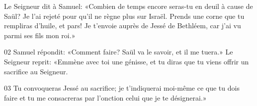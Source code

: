 Le Seigneur dit à Samuel: «Combien de temps encore seras-tu en deuil à cause de Saül? Je l’ai rejeté pour qu’il ne règne plus sur Israël. Prends une corne que tu rempliras d’huile, et pars! Je t’envoie auprès de Jessé de Bethléem, car j’ai vu parmi ses fils mon roi.»

02 Samuel répondit: «Comment faire? Saül va le savoir, et il me tuera.» Le Seigneur reprit: «Emmène avec toi une génisse, et tu diras que tu viens offrir un sacrifice au Seigneur.

03 Tu convoqueras Jessé au sacrifice; je t’indiquerai moi-même ce que tu dois faire et tu me consacreras par l’onction celui que je te désignerai.»
